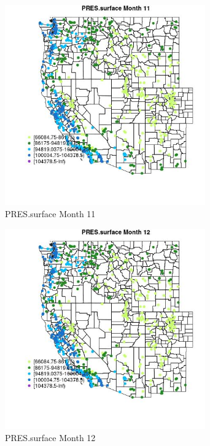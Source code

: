 \begin{figure} 
\centering  
\includegraphics[width=0.77\textwidth]{Code_Outputs/Report_ML_input_PM25_Step4_part_e_de_duplicated_aves_compiled_2019-05-21wNAs_MapObsMo11PRESsurface.jpg} 
\caption{\label{fig:Report_ML_input_PM25_Step4_part_e_de_duplicated_aves_compiled_2019-05-21wNAsMapObsMo11PRESsurface}PRES.surface Month 11} 
\end{figure} 
 

\clearpage 

\begin{figure} 
\centering  
\includegraphics[width=0.77\textwidth]{Code_Outputs/Report_ML_input_PM25_Step4_part_e_de_duplicated_aves_compiled_2019-05-21wNAs_MapObsMo12PRESsurface.jpg} 
\caption{\label{fig:Report_ML_input_PM25_Step4_part_e_de_duplicated_aves_compiled_2019-05-21wNAsMapObsMo12PRESsurface}PRES.surface Month 12} 
\end{figure} 
 

